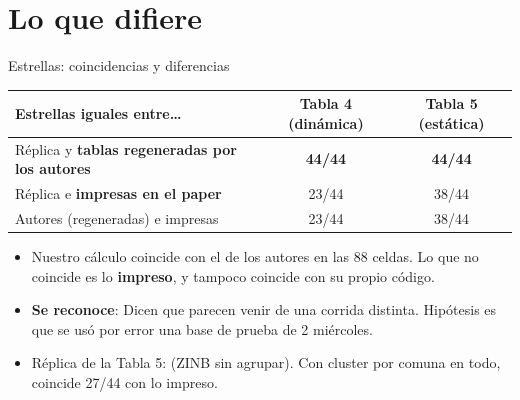 \documentclass[aspectratio=169,10pt,t]{beamer}
\begin{document}
\section{Lo que difiere}

\begin{frame}{Estrellas: coincidencias y diferencias}
  \centering\small
  \begin{tabular}{lcc}\toprule
    Estrellas iguales entre\ldots & Tabla 4 (dinámica) & Tabla 5 (estática) \\\midrule
    Réplica y \textbf{tablas regeneradas por los autores} & \textbf{44/44} & \textbf{44/44} \\
    Réplica e \textbf{impresas en el paper} & 23/44 & 38/44 \\
    Autores (regeneradas) e impresas & 23/44 & 38/44 \\\bottomrule
  \end{tabular}

  \vspace{6pt}
  \begin{flushleft}\footnotesize
    \begin{itemize}
      \item Nuestro cálculo coincide con el de los autores en las 88 celdas. Lo que no coincide es lo \textbf{impreso}, y tampoco coincide con su propio código.
      \item \textbf{Se reconoce}: Dicen que parecen venir de una corrida distinta. Hipótesis es que se usó por error una base de prueba de 2 miércoles.
      \item Réplica de la Tabla 5: (ZINB sin agrupar). Con cluster por comuna en todo, coincide 27/44 con lo impreso.
    \end{itemize}
  \end{flushleft}
\end{frame}
\end{document}
